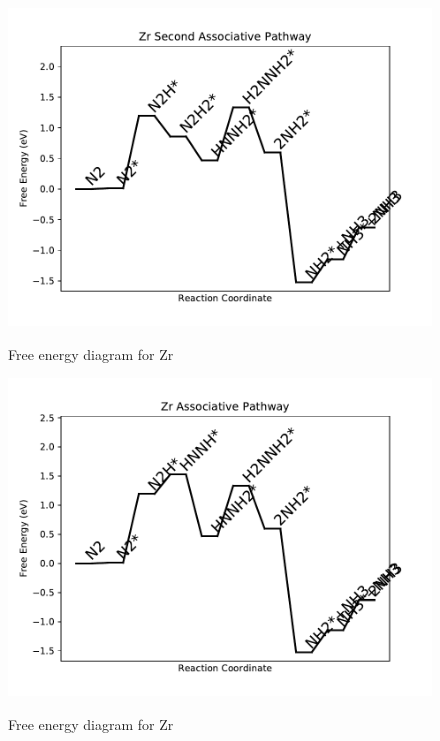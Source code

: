 \documentclass{article}
\begin{document}
\begin{figure}
\includegraphics[width=1\linewidth]{data/plots/Zr_associative_2.pdf}
\label{fig:Zr_associative_2}
\caption{Free energy diagram for Zr}
\end{figure}

\clearpage
\begin{figure}
\includegraphics[width=1\linewidth]{data/plots/Zr_associative.pdf}
\label{fig:Zr_associative}
\caption{Free energy diagram for Zr}
\end{figure}
\end{document}
